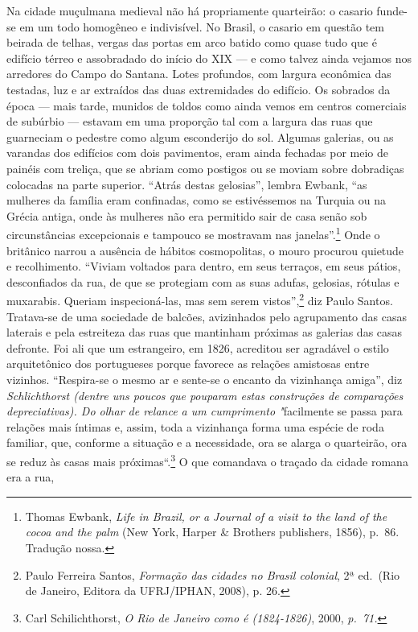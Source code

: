 Na cidade muçulmana medieval não há propriamente quarteirão: o casario
funde-se em um todo homogêneo e indivisível. No Brasil, o casario em
questão tem beirada de telhas, vergas das portas em arco batido como
quase tudo que é edifício térreo e assobradado do início do XIX --- e
como talvez ainda vejamos nos arredores do Campo do Santana. Lotes
profundos, com largura econômica das testadas, luz e ar extraídos das
duas extremidades do edifício. Os sobrados da época --- mais tarde,
munidos de toldos como ainda vemos em centros comerciais de subúrbio ---
estavam em uma proporção tal com a largura das ruas que guarneciam o
pedestre como algum esconderijo do sol. Algumas galerias, ou as varandas
dos edifícios com dois pavimentos, eram ainda fechadas por meio de
painéis com treliça, que se abriam como postigos ou se moviam sobre
dobradiças colocadas na parte superior. ``Atrás destas gelosias'',
lembra Ewbank, ``as mulheres da família eram confinadas, como se
estivéssemos na Turquia ou na Grécia antiga, onde às mulheres não era
permitido sair de casa senão sob circunstâncias excepcionais e tampouco
se mostravam nas janelas''.\footnote{Thomas Ewbank, \textit{Life in
  Brazil, or a Journal of a visit to the land of the cocoa and the palm}
  (New York, Harper \& Brothers publishers, 1856), p.~86. Tradução
  nossa.} Onde o britânico narrou a ausência de hábitos cosmopolitas, o
mouro procurou quietude e recolhimento. ``Viviam voltados para dentro,
em seus terraços, em seus pátios, desconfiados da rua, de que se
protegiam com as suas adufas, gelosias, rótulas e muxarabis. Queriam
inspecioná-las, mas sem serem vistos'',\footnote{Paulo Ferreira Santos,
  \textit{Formação das cidades no Brasil colonial}, 2ª ed.~(Rio de
  Janeiro, Editora da UFRJ/IPHAN, 2008), p. 26.} diz Paulo Santos.
Tratava-se de uma sociedade de balcões, avizinhados pelo agrupamento das
casas laterais e pela estreiteza das ruas que mantinham próximas as
galerias das casas defronte. Foi ali que um estrangeiro, em 1826,
acreditou ser agradável o estilo arquitetônico dos portugueses porque
favorece as relações amistosas entre vizinhos. ``Respira-se o mesmo ar e
sente-se o encanto da vizinhança amiga'', diz \textit{Schlichthorst
(dentre uns poucos que pouparam estas construções de comparações
depreciativas). Do olhar de relance a um cumprimento "}facilmente se
passa para relações mais íntimas e, assim, toda a vizinhança forma uma
espécie de roda familiar, que, conforme a situação e a necessidade, ora
se alarga o quarteirão, ora se reduz às casas mais próximas``.\footnote{Carl
  Schilichthorst, \textit{O Rio de Janeiro como é (1824-1826)}, 2000,
  \textit{p.~71.}} O que comandava o traçado da cidade romana era a rua,
